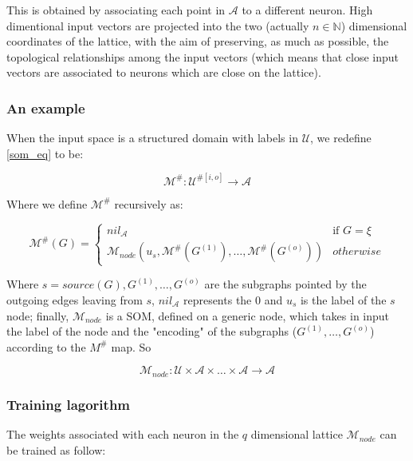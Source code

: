 This is obtained
by associating each point in $\mathcal{A}$ to a different neuron. High
dimentional input vectors are projected into the two (actually $n \in
\mathbb{N}$) dimensional coordinates of the lattice, with the aim of preserving,
as much as possible, the topological relationships among the input vectors
(which means that close input vectors are associated to neurons which are close
on the lattice).

\subsubsection{An example}

When the input space is a structured domain with labels in $\mathcal{U}$, we
redefine \autoref{som_eq} to be:

\begin{equation}
	\mathcal{M}^{\#}: \mathcal{U}^{\#[i,o]} \rightarrow \mathcal{A}
\end{equation}

Where we define $\mathcal{M}^{\#}$ recursively as:

\begin{equation}
	\mathcal{M}^{\#}(G) = 
		\begin{cases}
			nil_{\mathcal{A}} & \text{if } G=\xi \\
			\mathcal{M}_{node}(u_s, \mathcal{M}^{\#}(G^{(1)}), \dots, 
				\mathcal{M}^{\#}(G^{(o)})) & otherwise
		\end{cases}
\end{equation}

Where $s = source(G), G^{(1)}, \dots, G^{(o)}$ are the subgraphs pointed by the
outgoing edges leaving from $s$, $nil_{\mathcal{A}}$ represents the 0 and $u_s$
is the label of the $s$ node; finally, $\mathcal{M}_{node}$ is a SOM, defined on
a generic node, which takes in input the label of the node and the "encoding" of
the subgraphs ($G^{(1)}, \dots, G^{(o)}$) according to the $M^{\#}$ map. So 

\begin{equation}
	\mathcal{M}_{node}: \mathcal{U} \times \mathcal{A} \times \dots \times
	\mathcal{A} \rightarrow \mathcal{A}
\end{equation}

\subsubsection{Training lagorithm}

The weights associated with each neuron in the $q$ dimensional lattice
$\mathcal{M}_{node}$ can be trained as follow:

